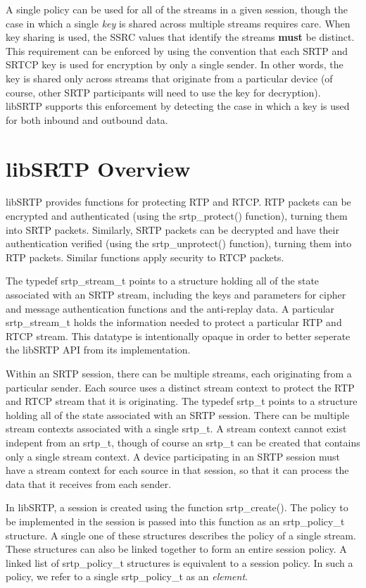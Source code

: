 A single policy can be used for all of the streams in a given session, though the case in which a single {\itshape key\/} is shared across multiple streams requires care. When key sharing is used, the SSRC values that identify the streams {\bfseries must} be distinct. This requirement can be enforced by using the convention that each SRTP and SRTCP key is used for encryption by only a single sender. In other words, the key is shared only across streams that originate from a particular device (of course, other SRTP participants will need to use the key for decryption). libSRTP supports this enforcement by detecting the case in which a key is used for both inbound and outbound data.\hypertarget{main_Overview}{}\section{libSRTP Overview}\label{main_Overview}
libSRTP provides functions for protecting RTP and RTCP. RTP packets can be encrypted and authenticated (using the srtp\_\-protect() function), turning them into SRTP packets. Similarly, SRTP packets can be decrypted and have their authentication verified (using the srtp\_\-unprotect() function), turning them into RTP packets. Similar functions apply security to RTCP packets.

The typedef srtp\_\-stream\_\-t points to a structure holding all of the state associated with an SRTP stream, including the keys and parameters for cipher and message authentication functions and the anti-\/replay data. A particular srtp\_\-stream\_\-t holds the information needed to protect a particular RTP and RTCP stream. This datatype is intentionally opaque in order to better seperate the libSRTP API from its implementation.

Within an SRTP session, there can be multiple streams, each originating from a particular sender. Each source uses a distinct stream context to protect the RTP and RTCP stream that it is originating. The typedef srtp\_\-t points to a structure holding all of the state associated with an SRTP session. There can be multiple stream contexts associated with a single srtp\_\-t. A stream context cannot exist indepent from an srtp\_\-t, though of course an srtp\_\-t can be created that contains only a single stream context. A device participating in an SRTP session must have a stream context for each source in that session, so that it can process the data that it receives from each sender.

In libSRTP, a session is created using the function srtp\_\-create(). The policy to be implemented in the session is passed into this function as an srtp\_\-policy\_\-t structure. A single one of these structures describes the policy of a single stream. These structures can also be linked together to form an entire session policy. A linked list of srtp\_\-policy\_\-t structures is equivalent to a session policy. In such a policy, we refer to a single srtp\_\-policy\_\-t as an {\itshape element\/}.

